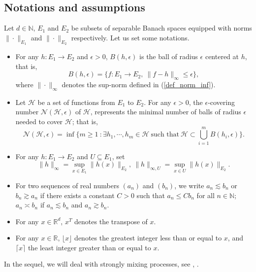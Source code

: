 \documentclass[10pt,twoside]{article}
\numberwithin{equation}{section}
\newcommand{\R}{\ensuremath{\mathbb{R}}}
\newcommand{\N}{\ensuremath{\mathbb{N}}}
\begin{document}
\subsection{Notations and assumptions}
%
Let $d \in \N$, $E_1$ and $E_2$ be subsets of separable Banach spaces equipped with norms $\| \cdot\|_{E_1}$ and $\| \cdot\|_{E_2}$ respectively.
Let us set some notations. 
%
\begin{itemize}
%
\item  For any $h: E_1 \rightarrow E_2$ and $\epsilon >0$, $B(h, \epsilon) $ is the ball of radius $\epsilon$ centered at $h$, that is,
%
\[ B (h, \epsilon) = \big\{ f: E_1 \rightarrow E_2, ~ \| f - h\|_\infty \leq \epsilon \big\},  \]
%
where $\| \cdot \|_\infty$ denotes the sup-norm defined in (\ref{def_norm_inf}).
%
\item Let $\mathcal{H}$ be a set of functions from $E_1$ to $E_2$. For any $\epsilon > 0$, the $\epsilon$-covering number $\mathcal{N}(\mathcal{H}, \epsilon)$  of $\mathcal{H} $, represents the minimal 
number of balls of radius $\epsilon$ needed to cover $\mathcal{H}$; that is,
%
\begin{equation}\label{epsi_covering_number}
 \mathcal{N}(\mathcal{H}, \epsilon) = \inf\Big\{ m \geq 1 ~: \exists h_1, \cdots, h_m \in \mathcal{H} ~ \text{such that} ~ \mathcal{H} \subset \bigcup_{i=1}^m B(h_i, \epsilon) \Big\}.
\end{equation}
%
\item For any $h: E_1 \rightarrow E_2$ and $U \subseteq E_1$, set
%
\begin{equation}\label{def_norm_inf}
\| h\|_{\infty} = \sup_{x \in E_1} \| h(x) \|_{E_2}, ~ \| h\|_{\infty,U} = \sup_{x \in U} \| h(x) \|_{E_2}.
\end{equation}  
\item  For two sequences of real numbers $(a_n)$ and $(b_n)$, we write $ a_n \lesssim b_n$ or $ b_n \gtrsim a_n$ if there exists a constant $C > 0$ such that $a_n \leq  C b_n$ for all $n \in \N$; $a_n \asymp b_n$ if $a_n \lesssim b_n$ and $a_n \gtrsim b_n$. 
%
\item For any $x \in \R^d$, $x^T$ denotes the transpose of $x$.
%
\item For any $x \in \R$, $\lfloor x \rfloor$ denotes the greatest integer less than or equal to $x$, and $\lceil x \rceil$ the least integer greater than or equal to $x$.  
% 
\end{itemize}
%
In the sequel, we will deal with strongly mixing processes, see \cite{rosenblatt1956central}, \cite{vidyasagar2013learning}.
\end{document}
